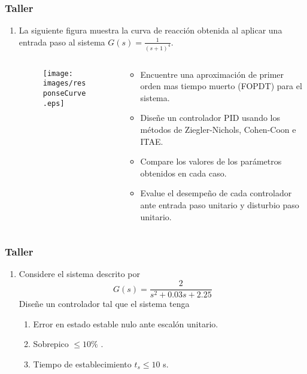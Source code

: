 \documentclass[aspectratio=169,handout]{beamer}
\theoremstyle{definition}
\theoremstyle{plain}
\theoremstyle{remark}
\newcounter{saveenumi}
\newcommand{\seti}{\setcounter{saveenumi}{\value{enumi}}}
\newcommand{\conti}{\setcounter{enumi}{\value{saveenumi}}}
\begin{document}
\begin{frame}[c]\frametitle{Taller}
	\begin{enumerate}
		\conti
		\item La siguiente figura muestra la curva de reacción obtenida al aplicar una entrada paso al sistema $G(s) = \frac{1}{(s+1)^4}$.
		\vspace*{-5mm}
		\begin{columns}
		\begin{column}{0.5\textwidth}
		\begin{figure}
			\texttt{[image: images/responseCurve.eps]}
		\end{figure}
		\end{column}	
		\begin{column}{0.5\textwidth}
		\begin{itemize}
			\item Encuentre una aproximación de primer orden mas tiempo muerto (FOPDT) para el sistema.
			\item Diseñe un controlador PID usando los métodos de Ziegler-Nichols, Cohen-Coon e ITAE.
			\item Compare los valores de los parámetros obtenidos en cada caso.
			\item Evalue el desempeño de cada controlador ante entrada paso unitario y disturbio paso unitario.
		\end{itemize}
		\end{column}	
		\end{columns}
		\seti
	\end{enumerate}
\end{frame}

\begin{frame}[c]\frametitle{Taller}
\begin{enumerate}
	\conti
	\item Considere el sistema descrito por
		\begin{equation*}
			G(s) = \frac{2}{s^2 + 0.03s + 2.25}
		\end{equation*}
		Diseñe un controlador tal que el sistema tenga
		\begin{enumerate}
			\item Error en estado estable nulo ante escalón unitario.
			\item Sobrepico $\leq 10\%$ .
			\item Tiempo de establecimiento $t_s \leq 10$ s.
		\end{enumerate}
	\seti 
\end{enumerate}
\end{frame}
\end{document}
